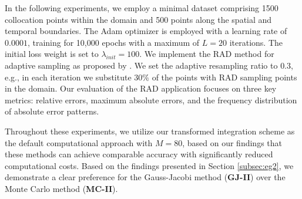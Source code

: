 \documentclass[preprint,3p,times]{elsarticle}
\begin{document}
In the following experiments, we employ a minimal dataset comprising 1500 collocation points within the domain and 500 points along the spatial and temporal boundaries. The Adam optimizer is employed with a learning rate of $0.0001$, training for 10,000 epochs with a maximum of $L=20$ iterations. The initial loss weight is set to $\lambda_{init}=100$. We implement the RAD method for adaptive sampling as proposed by \cite{LuLu:2023:RAD}. We set the adaptive resampling ratio to $0.3$, e.g., in each iteration we substitute $30\%$ of the points with RAD sampling points in the domain. Our evaluation of the RAD application focuses on three key metrics: relative errors, maximum absolute errors, and the frequency distribution of absolute error patterns.

Throughout these experiments, we utilize our transformed integration scheme as the default computational approach with $M=80$, based on our findings that these methods can achieve comparable accuracy with significantly reduced computational costs. Based on the findings presented in Section \ref{subsec:eg2}, we demonstrate a clear preference for the Gauss-Jacobi method (\textbf{GJ-II}) over the  Monte Carlo method (\textbf{MC-II}).
\end{document}
